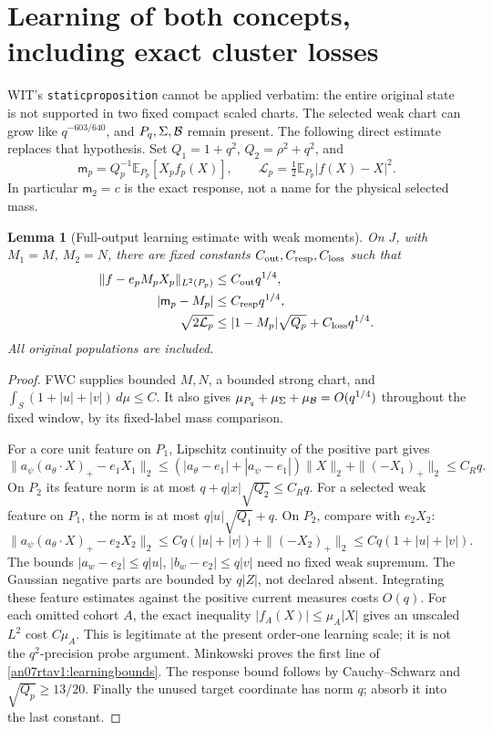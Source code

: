 \documentclass[11pt]{article}
\numberwithin{equation}{section}
\newtheorem{lemma}[theorem]{Lemma}
\newcommand{\E}{\mathbb E}\newcommand{\dd}{\,d}
\begin{document}
\section{Learning of both concepts, including exact cluster losses}
\label{an07rtav1:learningsection}
WIT's \texttt{staticproposition} cannot be applied verbatim:
the entire original state is not supported in two fixed compact
scaled charts. The selected weak chart can grow like
\(q^{-603/640}\), and \(P_q,\Sigma,\mathcal B\) remain present.
The following direct estimate replaces that hypothesis.
Set \(Q_1=1+q^2\), \(Q_2=\rho^2+q^2\), and
\[
 \mathsf m_p=Q_p^{-1}\E_{P_p}[X_pf_p(X)],\qquad
 \mathcal L_p=\tfrac12\E_{P_p}|f(X)-X|^2.
\]
In particular \(\mathsf m_2=c\) is the exact response,
not a name for the physical selected mass.

\begin{lemma}[Full-output learning estimate with weak moments]
\label{an07rtav1:learningestimate}
On \(J\), with \(M_1=M\), \(M_2=N\), there are fixed constants
\(C_{\rm out},C_{\rm resp},C_{\rm loss}\) such that
\begin{align}
 \|f-e_pM_pX_p\|_{L^2(P_p)}&\le C_{\rm out}q^{1/4},\notag\\
 |\mathsf m_p-M_p|&\le C_{\rm resp}q^{1/4},\notag\\
 \sqrt{2\mathcal L_p}&\le
       |1-M_p|\sqrt{Q_p}+C_{\rm loss}q^{1/4}.
 \label{an07rtav1:learningbounds}
\end{align}
All original populations are included.
\end{lemma}
\begin{proof}
FWC supplies bounded \(M,N\), a bounded strong chart, and
\(\int_S(1+|u|+|v|)\dd\mu\le C\).
It also gives
\(\mu_{P_q}+\mu_\Sigma+\mu_\mathcal B=O(q^{1/4})\)
throughout the fixed window, by its fixed-label mass comparison.

For a core unit feature on \(P_1\), Lipschitz continuity of
the positive part gives
\[
 \|a_\psi(a_\theta\cdot X)_+-e_1X_1\|_2
 \le (|a_\theta-e_1|+|a_\psi-e_1|)\|X\|_2
                       +\|(-X_1)_+\|_2\le C_Rq.
\]
On \(P_2\) its feature norm is at most
\(q+q|x|\sqrt{Q_2}\le C_Rq\).
For a selected weak feature on \(P_1\), the norm is at most
\(q|u|\sqrt{Q_1}+q\). On \(P_2\), compare with \(e_2X_2\):
\[
 \|a_\psi(a_\theta\cdot X)_+-e_2X_2\|_2
 \le Cq(|u|+|v|)+\|(-X_2)_+\|_2
 \le Cq(1+|u|+|v|).
\]
The bounds \(|a_w-e_2|\le q|u|\),
\(|b_w-e_2|\le q|v|\) need no fixed weak supremum.
The Gaussian negative parts are bounded by \(q|Z|\), not
declared absent. Integrating these feature estimates against
the positive current measures costs \(O(q)\).
For each omitted cohort \(A\), the exact inequality
\(|f_A(X)|\le\mu_A|X|\) gives an unscaled \(L^2\) cost
\(C\mu_A\). This is legitimate at the present order-one
learning scale; it is not the \(q^2\)-precision probe argument.
Minkowski proves the first line of \eqref{an07rtav1:learningbounds}.
The response bound follows by Cauchy--Schwarz and
\(\sqrt{Q_p}\ge13/20\). Finally the unused target coordinate
has norm \(q\); absorb it into the last constant.
\end{proof}
\end{document}

